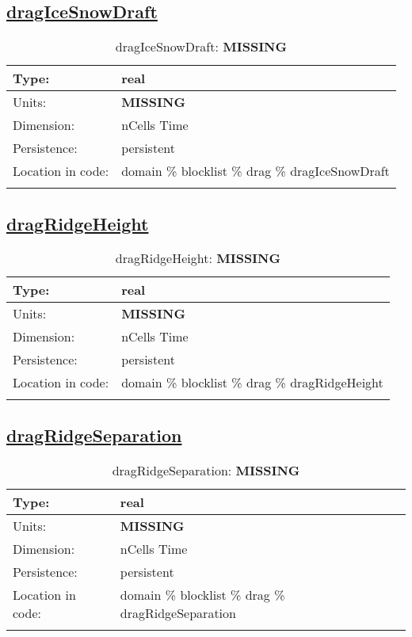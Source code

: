 \subsection[dragIceSnowDraft]{\hyperref[sec:var_tab_drag]{dragIceSnowDraft}}
\label{subsec:var_sec_drag_dragIceSnowDraft}
\begin{center}
\begin{longtable}{| p{2.0in} | p{4.0in} |}
        \hline 
        Type: & real \\
        \hline 
        Units: & {\bf \color{red} MISSING} \\
        \hline 
        Dimension: & nCells Time \\
        \hline 
        Persistence: & persistent \\
        \hline 
         Location in code: & domain \% blocklist \% drag \% dragIceSnowDraft \\
         \hline 
    \caption{dragIceSnowDraft: {\bf \color{red} MISSING}}
\end{longtable}
\end{center}
\subsection[dragRidgeHeight]{\hyperref[sec:var_tab_drag]{dragRidgeHeight}}
\label{subsec:var_sec_drag_dragRidgeHeight}
\begin{center}
\begin{longtable}{| p{2.0in} | p{4.0in} |}
        \hline 
        Type: & real \\
        \hline 
        Units: & {\bf \color{red} MISSING} \\
        \hline 
        Dimension: & nCells Time \\
        \hline 
        Persistence: & persistent \\
        \hline 
         Location in code: & domain \% blocklist \% drag \% dragRidgeHeight \\
         \hline 
    \caption{dragRidgeHeight: {\bf \color{red} MISSING}}
\end{longtable}
\end{center}
\subsection[dragRidgeSeparation]{\hyperref[sec:var_tab_drag]{dragRidgeSeparation}}
\label{subsec:var_sec_drag_dragRidgeSeparation}
\begin{center}
\begin{longtable}{| p{2.0in} | p{4.0in} |}
        \hline 
        Type: & real \\
        \hline 
        Units: & {\bf \color{red} MISSING} \\
        \hline 
        Dimension: & nCells Time \\
        \hline 
        Persistence: & persistent \\
        \hline 
         Location in code: & domain \% blocklist \% drag \% dragRidgeSeparation \\
         \hline 
    \caption{dragRidgeSeparation: {\bf \color{red} MISSING}}
\end{longtable}
\end{center}
